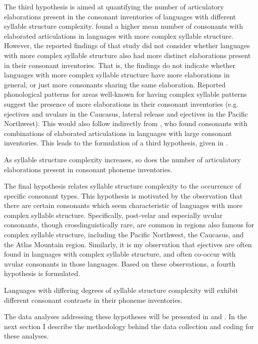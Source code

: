   The third hypothesis is aimed at quantifying the number of articulatory elaborations present in the consonant inventories of languages with different syllable structure complexity. \citet{MaddiesonEtAl2013} found a higher mean number of consonants with elaborated articulations in languages with more complex syllable structure. However, the reported findings of that study did not consider whether languages with more complex syllable structure also had more distinct elaborations present in their consonant inventories. That is, the findings do not indicate whether languages with more complex syllable structure have more elaborations in general, or just more consonants sharing the same elaboration. Reported phonological patterns for areas well-known for having complex syllable patterns suggest the presence of more elaborations in their consonant inventories (e.g. ejectives and uvulars in the Caucasus, lateral release and ejectives in the Pacific Northwest). This would also follow indirectly from \citet{LindblomMaddieson1988}, who found consonants with combinations of elaborated articulations in languages with large consonant inventories. This leads to the formulation of a third hypothesis, given in .

\ea\label{ex:4.4}
  As syllable structure complexity increases, so does the number of articulatory elaborations present in consonant phoneme inventories.
\z

  The final hypothesis relates syllable structure complexity to the occurrence of specific consonant types. This hypothesis is motivated by the observation that there are certain consonants which seem characteristic of languages with more complex syllable structure. Specifically, post-velar and especially uvular consonants, though crosslinguistically rare, are common in regions also famous for complex syllable structure, including the Pacific Northwest, the Caucasus, and the Atlas Mountain region. Similarly, it is my observation that ejectives are often found in languages with complex syllable structure, and often co-occur with uvular consonants in those languages. Based on these observations, a fourth hypothesis is formulated.

\ea\label{ex:4.5}
  Languages with differing degrees of syllable structure complexity will exhibit different consonant contrasts in their phoneme inventories.
\z

  The data analyses addressing these hypotheses will be presented in  and . In the next section I describe the methodology behind the data collection and coding for these analyses.

